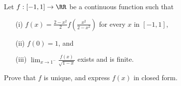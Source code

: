 Let $f: [-1, 1] \to \RR$ be a continuous function such that
\begin{itemize}
\item[(i)]
$f(x) = \frac{2-x^2}{2} f \left( \frac{x^2}{2-x^2} \right)$ for every $x$ in $[-1, 1]$,
\item[(ii)]
$f(0) = 1$, and
\item[(iii)]
$\lim_{x \to 1^-} \frac{f(x)}{\sqrt{1-x}}$ exists and is finite.
\end{itemize}
Prove that $f$ is unique, and express $f(x)$ in closed form.
